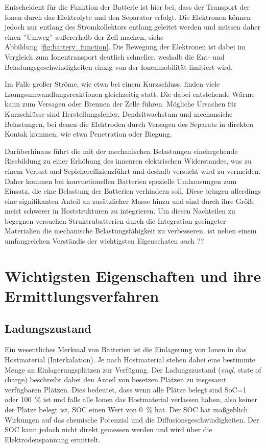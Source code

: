 Entscheident für die Funktion der Batterie ist hier bei, dass der Transport der Ionen durch das Elektrolyte und den Separator erfolgt. Die Elektronen können jedoch nur entlang des Stromkollektors entlang geleitet werden und  müssen daher einen ''Umweg'' außererhalb der Zell machen, siehe Abbildung~\ref{fig:battery_function}. Die Bewegung der Elektronen ist dabei im Vergleich zum Ionentransport deutlich schneller, weshalb die Ent- und Beladungsgeschwindigkeiten einzig von der Ionenmobilität limitiert wird. 

Im Falle großer Ströme, wie etwa bei einem Kurzschluss, finden viele Laungsumwandlungsreaktionen gleichzeitig statt. Die dabei entstehende Wärme kann zum Versagen oder Brennen der Zelle führen. Mögliche Ursachen für Kurzschlüsse sind Herstellungsfehler, Dendritwachstum und mechansiche Belastungen, bei denen die Elektroden durch Versagen des Separats in direkten Kontak kommen, wie etwa Penetration oder Biegung. 

Darüberhinaus führt die mit der mechanischen Belastungen einehrgehende Rissbildung zu einer Erhöhung des innenren elektrischen Widerstandes, was zu einem Verlust and Sepichereffizienzführt und deshalb versucht wird zu vermeiden.
Daher kommen bei konvnetionellen Batterien spezielle Umhausungen zum Einsatz, die eine Belastung der Batterien verhindern soll. Diese bringen allerdings eine signifikanten Anteil an zusätzlicher Masse hinzu und sind durch ihre Größe meist schwerer in Hoststrukturen zu integrieren. Um diesen Nachteilen zu begegnen versuchen Struktrubatterien durch die Integration geeingeter Materialien die mechanische Belastungsfähigkeit zu verbesseren.  ist neben einem umfangreichen Verständis der wichtigsten Eigenschaten auch ??



\section{Wichtigsten Eigenschaften und ihre Ermittlungsverfahren}
\subsection{Ladungszustand}
Ein wesentliches Merkmal von Batterien ist die Einlagerung von Ionen in das Hostmaterial (Interkalation). Je nach Hostmaterial stehen dabei eine bestimmte Menge an Einlagerungsplätzen zur Verfügung. Der Ladungszustand (\textit{engl.} state of charge) beschreibt dabei den Anteil von besetzen Plätzen zu insgesamt verfügbaren Plätzen.
Dies bedeutet, dass wenn alle Plätze belegt sind SoC=1 oder 100~\% ist und falls alle Ionen das Hostmaterial verlassen haben, also keiner der Plätze belegt ist, SOC einen Wert von 0~\% hat.
Der SOC hat maßgeblich Wirkungen auf das chemische Potenzial und die Diffusionsgeschwindigkeiten. Der SOC kann jedoch nicht direkt gemessen werden und wird über die Elektrodenspannung ermittelt.


